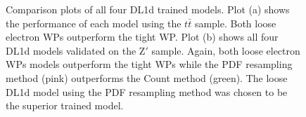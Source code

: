 \begin{figure}[h]
    \centering
    \qquad
    \caption{ Comparison plots of all four DL1d trained models. Plot (a) shows the performance of each model using the $t\bar{t}$ sample. Both loose electron WPs outperform the tight WP. Plot (b) shows
    all four DL1d models validated on the $\textrm{Z}'$ sample. Again, both loose electron WPs models outperform the tight WPs while the PDF resampling method (pink) outperforms the Count method (green).
    The loose DL1d model using the PDF resampling method was chosen to be the superior trained model. }
\label{fig:dl1d-comp}
\end{figure}

